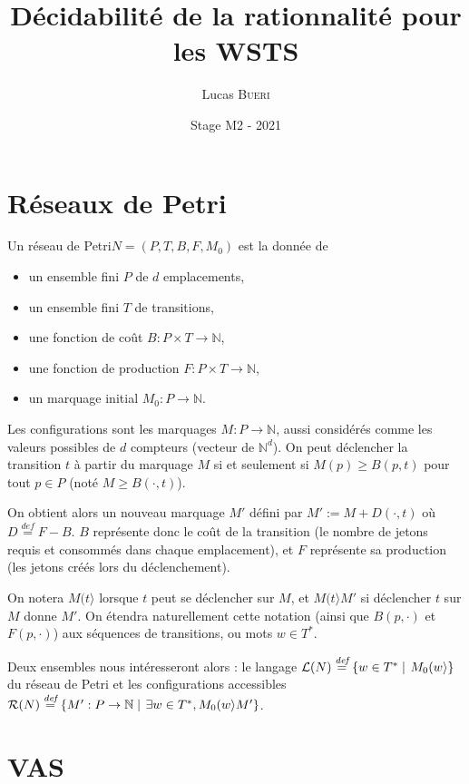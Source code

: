 \documentclass[a4paper,final]{article}
\title{Décidabilité de la rationnalité pour les WSTS}
\author{Lucas \textsc{Bueri}}
\date{Stage M2 - 2021}
\theoremstyle{definition}
\let\geq\geqslant
\newcommand{\set}[2]{\left\{#1\mathrel{\left|\vphantom{#1}\vphantom{#2}\right.}#2\right\}}
\newcommand{\defeq}{\ensuremath{\stackrel{\textit{def}}{=}}}
\newcommand{\N}{\ensuremath{\mathbb{N}}}
\newcommand{\petri}{réseau de Petri\xspace}
\newcommand{\fire}[2]{\ensuremath{#1 (#2\rangle}}
\newcommand{\lang}{\ensuremath{\mathcal{L}}}
\newcommand{\conf}{\ensuremath{\mathcal{R}}}
\begin{document}
\maketitle


\section{Réseaux de Petri}

Un \petri $N = (P,T,B,F,M_0)$ est la donnée de
\begin{itemize}
    \item un ensemble fini $P$ de $d$ emplacements,
    \item un ensemble fini $T$ de transitions,
    \item une fonction de coût $B: P\times T\to\N$,
    \item une fonction de production $F: P\times T\to\N$,
    \item un marquage initial $M_0: P\to\N$.
\end{itemize}

Les configurations sont les marquages $M: P\to\N$, aussi considérés comme les valeurs possibles de $d$ compteurs (vecteur de $\N^d$).
On peut déclencher la transition $t$ à partir du marquage $M$ si et
seulement si $M(p)\geq B(p,t)$ pour tout $p\in P$ (noté $M\geq B(\cdot,t)$).

On obtient alors un nouveau marquage $M'$ défini par $M':=M+D(\cdot,t)$ où $D\defeq F-B$. 
$B$ représente donc le coût de la transition (le nombre de jetons requis et consommés dans chaque emplacement), et $F$ représente sa production (les jetons créés lors du déclenchement).

On notera $\fire{M}{t}$ lorsque $t$ peut se déclencher sur $M$, et $\fire{M}{t}M'$ si déclencher $t$ sur $M$ donne $M'$.
On étendra naturellement cette notation (ainsi que $B(p,\cdot)$ et $F(p,\cdot)$) aux séquences de transitions, ou mots $w\in T^\ast$.

Deux ensembles nous intéresseront alors : le langage $\lang(N)\defeq \set{w\in T^\ast} {\fire{M_0}{w}}$ du \petri et les configurations accessibles $\conf(N)\defeq \set{M':P\to\N}{\exists w\in T^\ast, \fire{M_0}{w}M'}$.


\section{VAS}
\end{document}
